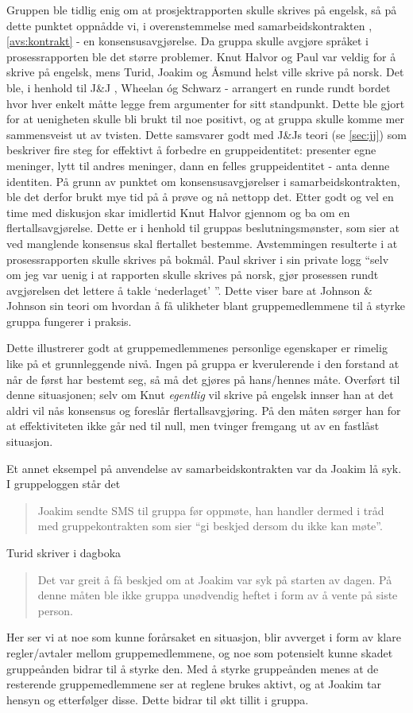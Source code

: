 Gruppen ble tidlig enig om at prosjektrapporten skulle skrives på engelsk, så på
dette punktet oppnådde vi, i overenstemmelse med samarbeidskontrakten ,
\cref{avs:kontrakt} - en konsensusavgjørelse. Da gruppa skulle avgjøre språket i
prosessrapporten ble det større problemer. Knut Halvor og Paul var veldig for å
skrive på engelsk, mens Turid, Joakim og Åsmund helst ville skrive på norsk. Det
ble, i henhold til J\&J \cite{jj}, Wheelan \cite{wheelan} óg Schwarz
\cite{schwarz} - arrangert en runde rundt bordet hvor hver enkelt måtte legge
frem argumenter for sitt standpunkt. Dette ble gjort for at uenigheten skulle
bli brukt til noe positivt, og at gruppa skulle komme mer sammensveist ut av
tvisten. Dette samsvarer godt med J\&Js teori (se \cref{sec:jj}) som beskriver
fire steg for effektivt å forbedre en gruppeidentitet: presenter egne meninger,
lytt til andres meninger, dann en felles gruppeidentitet - anta denne identiten.
På grunn av punktet om konsensusavgjørelser i samarbeidskontrakten, ble det
derfor brukt mye tid på å prøve og nå nettopp det. Etter godt og vel en time med
diskusjon skar imidlertid Knut Halvor gjennom og ba om en
flertallsavgjørelse. Dette er i henhold til gruppas beslutningsmønster, som sier
at ved manglende konsensus skal flertallet bestemme. Avstemmingen resulterte i
at prosessrapporten skulle skrives på bokmål. Paul skriver i sin private logg ``selv om jeg var uenig i at rapporten skulle
skrives på norsk, gjør prosessen rundt avgjørelsen det lettere å takle
`nederlaget' ''. Dette viser bare at Johnson \& Johnson sin teori \cite{jj} om
hvordan å få ulikheter blant gruppemedlemmene til å styrke gruppa fungerer i
praksis. 

Dette illustrerer godt at gruppemedlemmenes personlige egenskaper er rimelig
like på et grunnleggende nivå. Ingen på gruppa er kverulerende i den forstand at
når de først har bestemt seg, så må det gjøres på hans/hennes måte. Overført til
denne situasjonen; selv om Knut \emph{egentlig} vil skrive på
engelsk innser han at det aldri vil nås konsensus og foreslår
flertallsavgjøring. På den måten sørger han for at effektiviteten ikke går ned
til null, men tvinger fremgang ut av en fastlåst situasjon. 

Et annet eksempel på anvendelse av samarbeidskontrakten var da Joakim lå syk. I
gruppeloggen står det
\begin{quote}
Joakim sendte SMS til gruppa før oppmøte, han handler
dermed i tråd med gruppekontrakten som sier ``gi beskjed dersom du ikke kan
møte''.
\end{quote}
 Turid skriver i dagboka 
 \begin{quote}
 Det var greit å få beskjed om at Joakim var
syk på starten av dagen. På denne måten ble ikke gruppa unødvendig heftet i form
av å vente på siste person. 
\end{quote}
Her ser vi at noe som kunne forårsaket en situasjon, blir avverget i form av 
klare regler/avtaler mellom
gruppemedlemmene, og noe som potensielt kunne skadet gruppeånden bidrar til å
styrke den. Med å styrke gruppeånden menes at de resterende gruppemedlemmene ser
at reglene brukes aktivt, og at Joakim tar hensyn og etterfølger disse. Dette
bidrar til økt tillit i gruppa.

